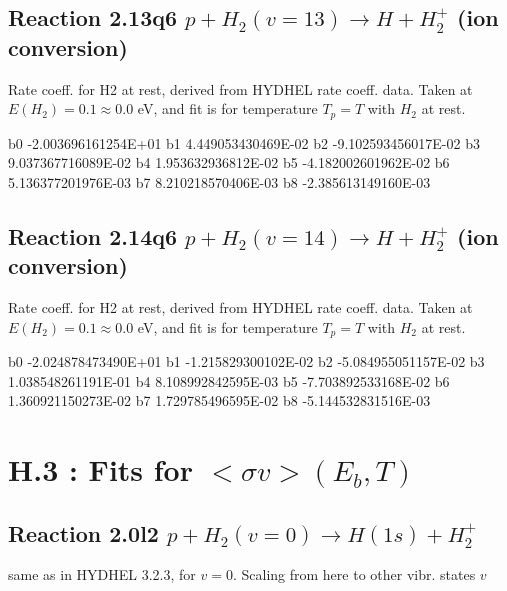 \documentclass[12pt,dvipdfmx]{article}
\begin{document}
\newpage
\subsection{
Reaction 2.13q6
$ p + H_2(v=13) \rightarrow H + H_2^+$ (ion conversion)
}
Rate coeff. for H2 at rest, derived from HYDHEL rate coeff. data.
Taken at $E(H_2) = 0.1 \approx 0.0$ eV,  and fit is for temperature $T_p=T$ with $H_2$ at rest.

\begin{{small}}\begin{{verbatim}}

  b0 -2.003696161254E+01  b1  4.449053430469E-02  b2 -9.102593456017E-02
  b3  9.037367716089E-02  b4  1.953632936812E-02  b5 -4.182002601962E-02
  b6  5.136377201976E-03  b7  8.210218570406E-03  b8 -2.385613149160E-03

\end{{verbatim}}\end{{small}}

\newpage
\subsection{
Reaction 2.14q6
$ p + H_2(v=14) \rightarrow H + H_2^+$ (ion conversion)
}
Rate coeff. for H2 at rest, derived from HYDHEL rate coeff. data.
Taken at $E(H_2) = 0.1 \approx 0.0$ eV,  and fit is for temperature $T_p=T$ with $H_2$ at rest.

\begin{{small}}\begin{{verbatim}}

  b0 -2.024878473490E+01  b1 -1.215829300102E-02  b2 -5.084955051157E-02
  b3  1.038548261191E-01  b4  8.108992842595E-03  b5 -7.703892533168E-02
  b6  1.360921150273E-02  b7  1.729785496595E-02  b8 -5.144532831516E-03

\end{{verbatim}}\end{{small}}

\newpage


\section{H.3 :  Fits for $<\sigma v> (E_b,T)$}

\subsection{
Reaction 2.0l2 $   p + H_2(v=0) \rightarrow H(1s) + H_2^+$}
same as in HYDHEL 3.2.3, for $v=0$. Scaling from here to other vibr. states $v$
\end{document}
